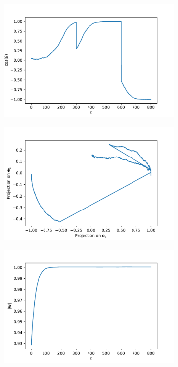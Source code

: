 \documentclass[12pt]{article}
\begin{document}
\begin{figure}[ht]
  \centering
  \captionsetup{width = \textwidth}
  \begin{subfigure}[b]{0.32\textwidth}
    \includegraphics[width=\textwidth]{4.1.pdf}
    \caption{}
    \label{fig:1}
  \end{subfigure}
  \begin{subfigure}[b]{0.32\textwidth}
    \includegraphics[width=\textwidth]{4.2.pdf}
    \caption{}
    \label{fig:2}
  \end{subfigure}
  \begin{subfigure}[b]{0.32\textwidth}
    \includegraphics[width=\textwidth]{4.3.pdf}
    \caption{}
    \label{fig:3}
  \end{subfigure}  
  

\end{figure}
\end{document}
